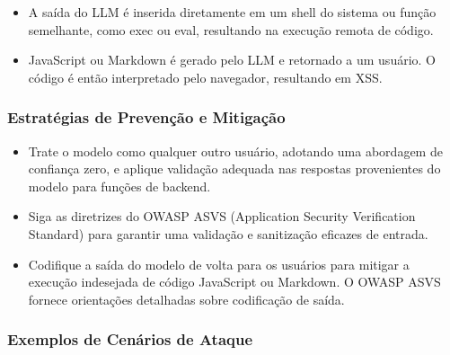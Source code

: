 \documentclass[
]{article}
\providecommand{\tightlist}{%
  \setlength{\itemsep}{0pt}\setlength{\parskip}{0pt}}
\begin{document}
\begin{itemize}
\tightlist
\item
  A saída do LLM é inserida diretamente em um shell do sistema ou função
  semelhante, como exec ou eval, resultando na execução remota de
  código.
\item
  JavaScript ou Markdown é gerado pelo LLM e retornado a um usuário. O
  código é então interpretado pelo navegador, resultando em XSS.
\end{itemize}

\subsubsection{Estratégias de Prevenção e
Mitigação}\label{estratuxe9gias-de-prevenuxe7uxe3o-e-mitigauxe7uxe3o}

\begin{itemize}
\tightlist
\item
  Trate o modelo como qualquer outro usuário, adotando uma abordagem de
  confiança zero, e aplique validação adequada nas respostas
  provenientes do modelo para funções de backend.
\item
  Siga as diretrizes do OWASP ASVS (Application Security Verification
  Standard) para garantir uma validação e sanitização eficazes de
  entrada.
\item
  Codifique a saída do modelo de volta para os usuários para mitigar a
  execução indesejada de código JavaScript ou Markdown. O OWASP ASVS
  fornece orientações detalhadas sobre codificação de saída.
\end{itemize}

\subsubsection{Exemplos de Cenários de
Ataque}\label{exemplos-de-cenuxe1rios-de-ataque}
\end{document}
